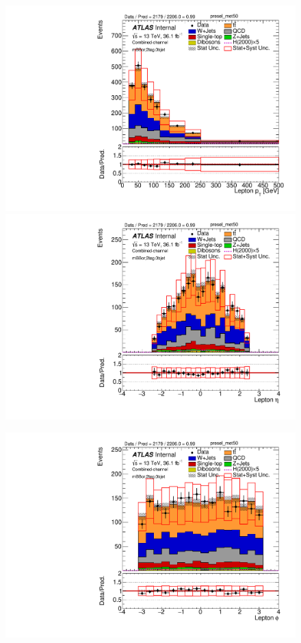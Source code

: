 \begin{figure}[!h]
\begin{center}
\includegraphics[scale=0.33]{./figures/boosted/PlotsInMbbCR/DataMC_2tag_0bjet_mbbcr_lepton_presel_met50_LepPt}
\includegraphics[scale=0.33]{./figures/boosted/PlotsInMbbCR/DataMC_2tag_0bjet_mbbcr_lepton_presel_met50_LepEta}\\
\par\medskip
\includegraphics[scale=0.33]{./figures/boosted/PlotsInMbbCR/DataMC_2tag_0bjet_mbbcr_lepton_presel_met50_LepPhi}

\end{center}
\end{figure}
